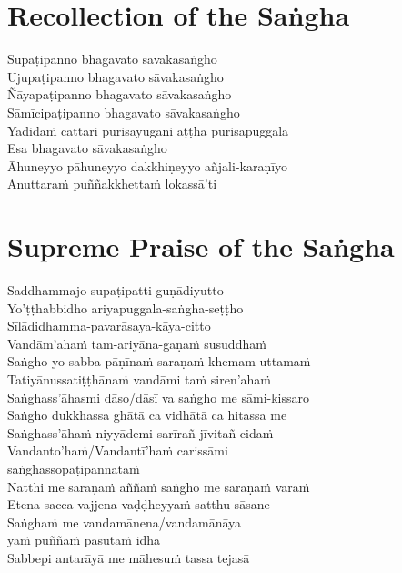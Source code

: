 \section*{Recollection of the Saṅgha}

\begin{leader}
\end{leader}

Supaṭipanno bhagavato sāvakasaṅgho\\
Ujupaṭipanno bhagavato sāvakasaṅgho\\
Ñāyapaṭipanno bhagavato sāvakasaṅgho\\
Sāmīcipaṭipanno bhagavato sāvakasaṅgho\\
Yadidaṁ cattāri purisayugāni aṭṭha purisapuggalā\\
Esa bhagavato sāvakasaṅgho\\
Āhuneyyo pāhuneyyo dakkhiṇeyyo añjali-karaṇīyo\\
Anuttaraṁ puññakkhettaṁ lokassā'ti

\section*{Supreme Praise of the Saṅgha}

\begin{leader}
\end{leader}

Saddhammajo supaṭipatti-guṇādiyutto\\
Yo'ṭṭhabbidho ariyapuggala-saṅgha-seṭṭho\\
Sīlādidhamma-pavarāsaya-kāya-citto\\
Vandām'ahaṁ tam-ariyāna-gaṇaṁ susuddhaṁ\\
Saṅgho yo sabba-pāṇīnaṁ saraṇaṁ khemam-uttamaṁ\\
Tatiyānussatiṭṭhānaṁ vandāmi taṁ siren'ahaṁ\\
Saṅghass'āhasmi dāso/dāsī va saṅgho me sāmi-kissaro\\
Saṅgho dukkhassa ghātā ca vidhātā ca hitassa me\\
Saṅghass'āhaṁ niyyādemi sarīrañ-jīvitañ-cidaṁ\\
Vandanto'haṁ/Vandantī'haṁ carissāmi\\
\vin saṅghassopaṭipannataṁ\\
Natthi me saraṇaṁ aññaṁ saṅgho me saraṇaṁ varaṁ\\
Etena sacca-vajjena vaḍḍheyyaṁ satthu-sāsane\\
Saṅghaṁ me vandamānena/vandamānāya\\
\vin yaṁ puññaṁ pasutaṁ idha\\
Sabbepi antarāyā me māhesuṁ tassa tejasā

